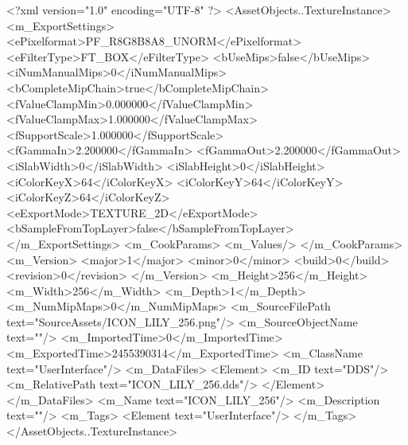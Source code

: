 <?xml version="1.0" encoding="UTF-8" ?>
<AssetObjects..TextureInstance>
	<m_ExportSettings>
		<ePixelformat>PF_R8G8B8A8_UNORM</ePixelformat>
		<eFilterType>FT_BOX</eFilterType>
		<bUseMips>false</bUseMips>
		<iNumManualMips>0</iNumManualMips>
		<bCompleteMipChain>true</bCompleteMipChain>
		<fValueClampMin>0.000000</fValueClampMin>
		<fValueClampMax>1.000000</fValueClampMax>
		<fSupportScale>1.000000</fSupportScale>
		<fGammaIn>2.200000</fGammaIn>
		<fGammaOut>2.200000</fGammaOut>
		<iSlabWidth>0</iSlabWidth>
		<iSlabHeight>0</iSlabHeight>
		<iColorKeyX>64</iColorKeyX>
		<iColorKeyY>64</iColorKeyY>
		<iColorKeyZ>64</iColorKeyZ>
		<eExportMode>TEXTURE_2D</eExportMode>
		<bSampleFromTopLayer>false</bSampleFromTopLayer>
	</m_ExportSettings>
	<m_CookParams>
		<m_Values/>
	</m_CookParams>
	<m_Version>
		<major>1</major>
		<minor>0</minor>
		<build>0</build>
		<revision>0</revision>
	</m_Version>
	<m_Height>256</m_Height>
	<m_Width>256</m_Width>
	<m_Depth>1</m_Depth>
	<m_NumMipMaps>0</m_NumMipMaps>
	<m_SourceFilePath text="SourceAssets/ICON_LILY_256.png"/>
	<m_SourceObjectName text=""/>
	<m_ImportedTime>0</m_ImportedTime>
	<m_ExportedTime>2455390314</m_ExportedTime>
	<m_ClassName text="UserInterface"/>
	<m_DataFiles>
		<Element>
			<m_ID text="DDS"/>
			<m_RelativePath text="ICON_LILY_256.dds"/>
		</Element>
	</m_DataFiles>
	<m_Name text="ICON_LILY_256"/>
	<m_Description text=""/>
	<m_Tags>
		<Element text="UserInterface"/>
	</m_Tags>
</AssetObjects..TextureInstance>

